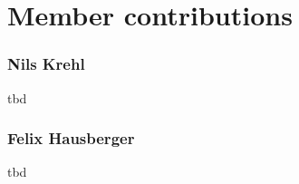\section*{Member contributions}

\subsubsection*{Nils Krehl}

tbd

\subsubsection*{Felix Hausberger}

tbd
